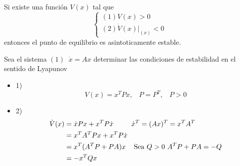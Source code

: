 Si existe una función \( V(x) \) tal que
\[
    \left\{
        \begin{array}{lll}
            (1) V(x) > 0\\
            (2) \dot{V}(x) \big |_{(x)} < 0
        \end{array}
    \right.
\]
entonces el punto de equilibrio es asintoticamente estable.

Sea el sistema \((1) \;\; \dot{x} = Ax \) determinar las condiciones de estabilidad en el sentido de Lyapunov
\begin{itemize}
    \item 1) 
    \[
        V(x) = x^{T}Px, \;\;\; P = P^{T}, \;\;\; P > 0
    \]
    
    \item 2) 
    \[
        \begin{split}
            \dot{V}(x) & = \dot{x}Px + x^{T}P\dot{x} \;\;\; \text{\;\;\; \;\;\(\dot{x}^{T} = (Ax)^{T} = x^{T}A^{T}\) }\\
            & = x^{T}A^{T}Px + x^{T}P\dot{x} \\
            & = x^{T}(A^{T}P + PA)x \;\;\; \text{  Sea \( Q > 0\) \( A^{T}P + PA = -Q\)} \\
            & = -x^{T}Qx
        \end{split}
    \]
\end{itemize}